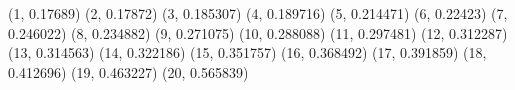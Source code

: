 (1, 0.17689) (2, 0.17872) (3, 0.185307) (4, 0.189716) (5, 0.214471) (6, 0.22423) (7, 0.246022) (8, 0.234882) (9, 0.271075) (10, 0.288088) (11, 0.297481) (12, 0.312287) (13, 0.314563) (14, 0.322186) (15, 0.351757) (16, 0.368492) (17, 0.391859) (18, 0.412696) (19, 0.463227) (20, 0.565839) 